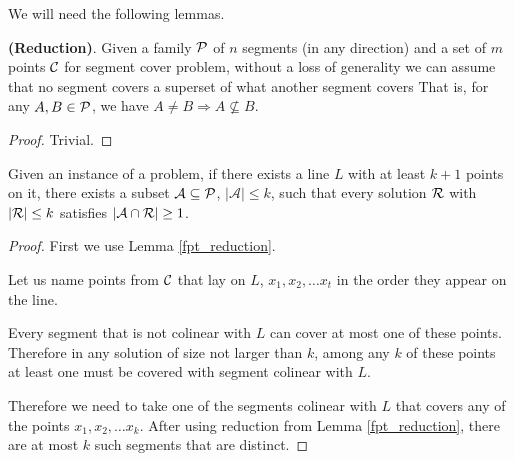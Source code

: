 We will need the following lemmas.

\begin{lemma}
   \label{fpt_reduction}
   \textbf{(Reduction)}.
   Given a family $\mathcal{P}$ of
	$n$ segments (in any direction)
	and a set of $m$ points $\mathcal{C}$
	for segment cover problem,
   without a loss of generality we can assume that
   no segment covers a superset of what another segment covers
   That is, for any $A, B \in \mathcal{P}$, we have
   $A \neq B \Rightarrow A \not \subseteq B$.
\end{lemma}   
   
\begin{proof} Trivial. \end{proof}

\begin{lemma}
	\label{fpt_long_lines}
	Given an instance of a problem, if there exists a line $L$ with at least
	$k+1$ points on it, there exists a subset $\mathcal{A} \subseteq \mathcal{P}$,
	$|\mathcal{A}| \le k$,
	such that every solution $\mathcal{R}$ with $|\mathcal{R}| \le k$
	satisfies $|\mathcal{A} \cap \mathcal{R}| \ge 1$.
\end{lemma}

\begin{proof}

First we use Lemma \ref{fpt_reduction}.

Let us name points from $\mathcal{C}$ that lay on $L$, $x_1, x_2, \ldots x_t$
in the order they appear on the line.

Every segment that is not colinear with $L$ can cover at most one of these
points. Therefore in any solution of size not larger than $k$,
among any $k$ of these points at least one must
be covered with segment colinear with $L$.

Therefore we need to take one of the segments colinear
with $L$ that covers any of the points
$x_1, x_2, \ldots x_k$. After using reduction from Lemma \ref{fpt_reduction},
there are at most $k$ such segments that are distinct.
\end{proof}



